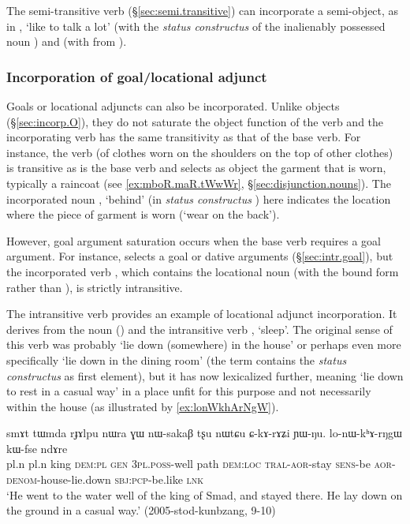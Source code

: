 The semi-transitive verb  (§\ref{sec:semi.transitive}) can incorporate a semi-object, as in , `like to talk a lot' (with the \textit{status constructus}  of the inalienably possessed noun ) and  (with  from ).

 
\subsubsection{Incorporation of goal/locational adjunct} \label{sec:incorp.goal}
Goals or locational adjuncts can also be incorporated. Unlike objects (§\ref{sec:incorp.O}), they do not saturate the object function of the verb and the incorporating verb has the same transitivity as that of the base verb. For instance, the verb  (of clothes worn on the shoulders on the top of other clothes) is transitive as is the base verb  and selects as object the garment that is worn, typically a raincoat  (see \ref{ex:mboR.maR.tWwWr}, §\ref{sec:disjunction.nouns}). The incorporated noun , `behind' (in \textit{status constructus} ) here indicates the location where the piece of garment is worn (`wear on the back').

However, goal argument saturation occurs when the base verb requires a goal argument. For instance,  selects a goal or dative arguments (§\ref{sec:intr.goal}), but the incorporated verb , which contains the locational noun  (with the bound form  rather than ), is strictly intransitive.

The intransitive verb  provides an example of locational adjunct incorporation.  It derives from the noun   () and the intransitive verb , `sleep'. The original sense of this verb was probably `lie down (somewhere) in the house' or perhaps even more specifically  `lie down in the dining room' (the term  contains the \textit{status constructus}  as first element), but it has now lexicalized further, meaning `lie down to rest in a casual way' in a place unfit for this purpose and not necessarily within the house (as illustrated by \ref{ex:lonWkhArNgW}).

\begin{exe}
\ex \label{ex:lonWkhArNgW}
\gll  smɤt tɯmda rɟɤlpu nɯra ɣɯ nɯ-sakaβ tʂu nɯtɕu ɕ-kɤ-rɤʑi ɲɯ-ŋu.  lo-nɯ-kʰɤ-rŋgɯ kɯ-fse ndɤre \\
pl.n pl.n king \textsc{dem}:\textsc{pl} \textsc{gen} \textsc{3pl}.\textsc{poss}-well path \textsc{dem}:\textsc{loc} \textsc{tral}-\textsc{aor}-stay \textsc{sens}-be \textsc{aor}-\textsc{denom}-house-lie.down \textsc{sbj}:\textsc{pcp}-be.like \textsc{lnk} \\
\glt `He went to the water well of the king of Smad, and stayed there. He lay down on the ground in a casual way.' (2005-stod-kunbzang, 9-10)
\end{exe}

